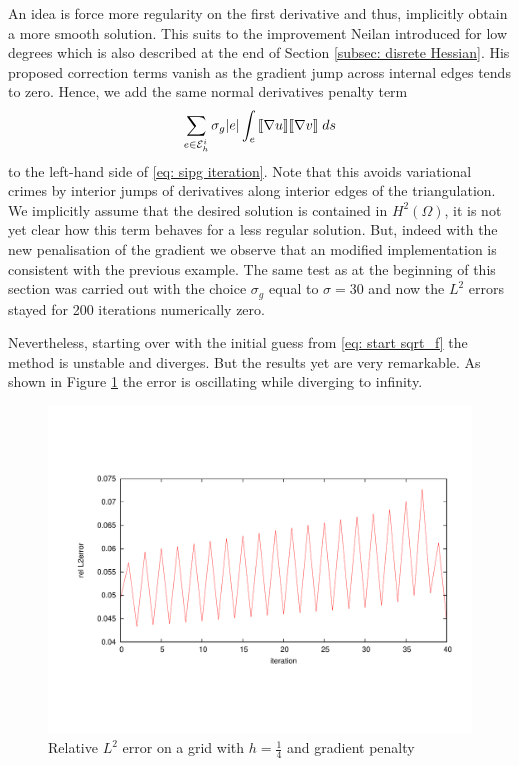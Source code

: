 An idea is force more regularity on the first derivative and thus, implicitly obtain a more smooth solution. This suits to the improvement Neilan introduced for low degrees \cite[Section 5]{Neilan2014} which is also described at the end of Section \ref{subsec: disrete Hessian}. His proposed correction terms vanish as the gradient jump across internal edges tends to zero.
Hence, we add the same normal derivatives penalty term 
\begin{align}
	\sum_{e \in \mathcal{E}_h^i} \sigma_g |e |\int_{e} {{\llbracket  \nabla u \rrbracket \llbracket \nabla v \rrbracket}\;ds} \label{eq: grad penalty term}
\end{align}
to the left-hand side of \eqref{eq: sipg iteration}.
Note that this avoids variational crimes by interior jumps of derivatives along interior edges of the triangulation. We implicitly assume that the desired solution is contained in $H^2(\Omega)$, it is not yet clear how this term behaves for a less regular solution.
But, indeed with the new penalisation of the gradient we observe that an modified implementation is consistent with the previous example. The same test as at the beginning of this section was carried out with the choice $\sigma_g$ equal to $\sigma=30$ and now the $L^2$ errors stayed for 200 iterations numerically zero.

Nevertheless, starting over with the initial guess from \eqref{eq: start sqrt_f} the method is unstable and diverges. But the results yet are very remarkable. As shown in Figure \ref{fig: oscillation} the error is oscillating while diverging  to infinity.
\begin{figure}[H]
	\centering
	\includegraphics[trim = 2cm 4cm 1cm 4cm, width=1\textwidth]{plots/oscillation.pdf}
	\caption{Relative $L^2$ error on a grid with $h=\frac 1 4$ and gradient penalty}
	\label{fig: oscillation}
\end{figure}


